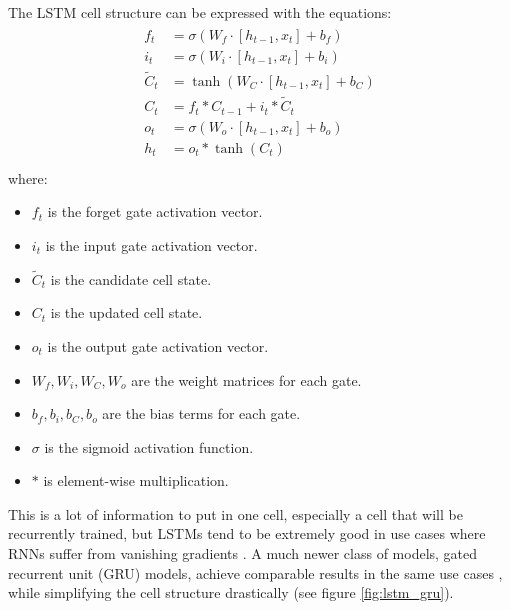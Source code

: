 \documentclass[12pt]{scrreprt}
\begin{document}
The LSTM cell structure can be expressed with the equations:
\begin{align}
    \begin{split}
        f_t &= \sigma(W_f \cdot [h_{t-1}, x_t] + b_f) \\
        i_t &= \sigma(W_i \cdot [h_{t-1}, x_t] + b_i) \\
        \tilde{C}_t &= \tanh(W_C \cdot [h_{t-1}, x_t] + b_C) \\
        C_t &= f_t \ast C_{t-1} + i_t \ast \tilde{C}_t \\
        o_t &= \sigma(W_o \cdot [h_{t-1}, x_t] + b_o) \\
        h_t &= o_t \ast \tanh(C_t)\\
    \end{split}
\end{align}
where:
\begin{itemize}
    \item $f_t$ is the forget gate activation vector.
    \item $i_t$ is the input gate activation vector.
    \item $\tilde{C}_t$ is the candidate cell state.
    \item $C_t$ is the updated cell state.
    \item $o_t$ is the output gate activation vector.
    \item $W_f, W_i, W_C, W_o$ are the weight matrices for each gate.
    \item $b_f, b_i, b_C, b_o$ are the bias terms for each gate.
    \item $\sigma$ is the sigmoid activation function.
    \item $\ast$ is element-wise multiplication.
\end{itemize}

This is a lot of information to put in one cell, especially a cell that will be recurrently trained, but LSTMs tend to be extremely good in use cases where RNNs suffer from vanishing gradients \cite{Olah15}. A much newer class of models, gated recurrent unit (GRU) models, achieve comparable results in the same use cases \cite{Chung14, Yin17, Nti20}, while simplifying the cell structure drastically (see figure \ref{fig:lstm_gru}).
\end{document}
